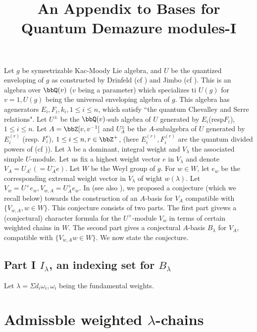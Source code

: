 \title{An Appendix to Bases for Quantum Demazure modules-I}

\author{}
\date{}
\maketitle

Let $g$ be symeetrizable Kac-Moody Lie algebra, and $U$ be the quantized enveloping of $g$ as constructed by Drinfeld (cf \cite{art10-keyD}) and Jimbo (cf \cite{art10-keyJ}). This is an algebra over $\bbQ(v)$ ($v$ being a parameter) which specializes ti $U(g)$ for $v=1, U(g)$ being the universal enveloping algebra of $g$. This algebra has agenerators $E_{i}, F_{i}, k_{i}, 1 \leq i \leq n$, which satisfy ``the quantum Chevalley and Serre relations". Let $U^{\pm}$ be the $\bbQ(v)$-sub algebra of $U$ generated by $E_{i}$(resp$F_{i}$), $1 \leq i \leq n$. Let $A = \bbZ[v, v^{-1}]$ and $U_{A}^{\pm}$ be the $A$-subalgebra of $U$ generated by $E_{i}^{(r)}$ (resp. $F_{i}^{r}$), $1 \leq i \leq n, r \in \bbZ^{+}$, (here $E_{i}^{(r)}, F_{i}^{(r)}$ are the quantum divided powers of (cf \cite{art10-keyJ})). Let $\lambda$ be a dominant, integral weight and $V_{\lambda}$ the associated simple $U$-module. Let us fix a highest weight vector $e$ in $V_{\lambda}$ and denote $V_{A}=U_{A^{e}}(=U_{A}^{-}e)$. Let $W$ be the Weyl group of $g$. For $w \in W$, let $e_{w}$ be the corresponding extremal weight vector in $V_{\lambda}$ of wight $w(\lambda)$. Let $V_{w} = U^{+}e_{w}, V_{w, A} = U_{A}^{+}e_{w}$. In \cite{art10-keyLa} (see also \cite{art9-keyLS}), we proposed a conjecture (which we recall below) towards the construction of an $A$-basis for $V_{A}$ compatible with $\{V_{w, A}, w \in W\}$. This conjecture consists of two parts. The first part givews a (conjectural) character formula for the  $U^{+}$-module $V_{w}$ in terms of certain weighted chains in $W$. The second part gives a conjectural $A$-basis $B_{\lambda}$ for $V_{A}$, compatible with
 $\{V_{w, A} w \in W \}$. We now state the conjecture.  

\subsection*{Part I $I_{\lambda}$, an indexing set for $B_{\lambda}$}
Let $\lambda = \Sigma d_{i}\omega_{i}, \omega_{i}$ being the fundamental weights.

\section*{Admissble weighted $\lambda$-chains}
~

